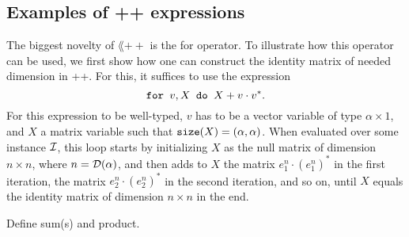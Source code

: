 \subsection{Examples of \lang++ expressions}




The biggest novelty of $\lang++$ is the for operator. To illustrate how this operator can be used, we first show how one can construct the identity matrix of needed dimension in \lang++. For this, it suffices to use the expression $$\texttt{for }v,X \texttt{ do }X + v\cdot v^*.$$ For this expression to be well-typed, $v$ has to be a vector variable of type $\alpha\times 1$, and $X$ a matrix variable such that $\texttt{size}(X) = (\alpha,\alpha)$. When evaluated over some instance $\mathcal{I}$, this loop starts by initializing $X$ as the null matrix of dimension $n\times n$, where $n=\mathcal{D}(\alpha)$, and then adds to $X$ the matrix $e_1^n\cdot (e_1^n)^*$ in the first iteration, the matrix $e_2^n\cdot (e_2^n)^*$ in the second iteration, and so on, until $X$ equals the identity matrix of dimension $n\times n$ in the end.


 Define sum(s) and product.

